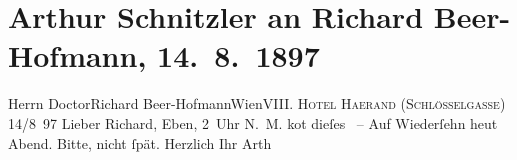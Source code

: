 

         
         \renewcommand{\erwaehntePersonen}{Personen: Richard Beer-Hofmann}
         \renewcommand{\erwaehnteOrte}{Orte: Hotel Hammerand, Schlösselgasse, Wien}
         \renewcommand{\erwaehnteWerke}{}
               \section[Arthur Schnitzler an Richard Beer-Hofmann, 14. 8. 1897]{ Arthur Schnitzler an Richard Beer-Hofmann, 14. 8. 1897}\nopagebreak{}\rehead{ }\begin{ledgroupsized}[t]{13cm}\normalsize\beginnumbering{} \toendnotes[C]{\smallbreak\pagebreak[2]} 
\toendnotes[C]{\smallbreak}\pstart{}{\pb}Herrn Doctor\pend{}\pstart{}Richard Beer-Hofmann\pend{}\pstart{}Wien\pend{}\pstart{}\textsc{VIII. Hotel Ha{\geminationm}erand (Schlösselgasse)}\pend{}{\bigskip}\pstart
           {\pb}14/8 97\pend
           \pstart{}Lieber Richard,\pend\pstart
           Eben, 2 Uhr N. M. ko{\geminationm}t dieſes \label{K_L00716-1v}\label{K_L00716-1h} –\pend
           \pstart
           Auf Wiederſehn heut Abend. Bitte, nicht ſpät.\pend
           \pstart Herzlich Ihr \spacefill\mbox{Arth}\pend{}
         
         \endnumbering{}\end{ledgroupsized}  \newcommand{\dateiname}{L00716}\newcommand{\titel}{Arthur Schnitzler an Richard Beer-Hofmann, 14. 8. 1897}\newcommand{\editorInnen}{ Martin Anton Müller und Gerd-Hermann Susen}
      
